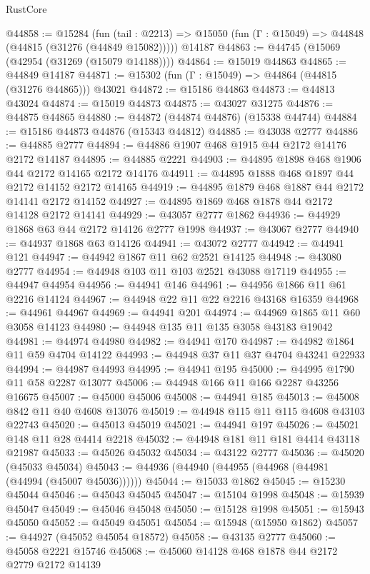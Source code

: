 \begin{lexlean}{RustCore}
\begin{coremodule}
@44858 := @15284
    (fun (tail : @2213) => @15050 (fun (Γ : @15049) => @44848 (@44815 (@31276 (@44849 @15082)))))
    @14187
@44863 := @44745 (@15069 (@42954 (@31269 (@15079 @14188))))
@44864 := @15019 @44863
@44865 := @44849 @14187
@44871 := @15302 (fun (Γ : @15049) => @44864 (@44815 (@31276 @44865))) @43021
@44872 := @15186 @44863
@44873 := @44813 @43024
@44874 := @15019 @44873
@44875 := @43027 @31275
@44876 := @44875 @44865
@44880 := @44872 (@44874 @44876) (@15338 @44744)
@44884 := @15186 @44873 @44876 (@15343 @44812)
@44885 := @43038 @2777
@44886 := @44885 @2777
@44894 := @44886 @1907 @468 @1915 @44 @2172 @14176 @2172 @14187
@44895 := @44885 @2221
@44903 := @44895 @1898 @468 @1906 @44 @2172 @14165 @2172 @14176
@44911 := @44895 @1888 @468 @1897 @44 @2172 @14152 @2172 @14165
@44919 := @44895 @1879 @468 @1887 @44 @2172 @14141 @2172 @14152
@44927 := @44895 @1869 @468 @1878 @44 @2172 @14128 @2172 @14141
@44929 := @43057 @2777 @1862
@44936 := @44929 @1868 @63 @44 @2172 @14126 @2777 @1998
@44937 := @43067 @2777
@44940 := @44937 @1868 @63 @14126
@44941 := @43072 @2777
@44942 := @44941 @121
@44947 := @44942 @1867 @11 @62 @2521 @14125
@44948 := @43080 @2777
@44954 := @44948 @103 @11 @103 @2521 @43088 @17119
@44955 := @44947 @44954
@44956 := @44941 @146
@44961 := @44956 @1866 @11 @61 @2216 @14124
@44967 := @44948 @22 @11 @22 @2216 @43168 @16359
@44968 := @44961 @44967
@44969 := @44941 @201
@44974 := @44969 @1865 @11 @60 @3058 @14123
@44980 := @44948 @135 @11 @135 @3058 @43183 @19042
@44981 := @44974 @44980
@44982 := @44941 @170
@44987 := @44982 @1864 @11 @59 @4704 @14122
@44993 := @44948 @37 @11 @37 @4704 @43241 @22933
@44994 := @44987 @44993
@44995 := @44941 @195
@45000 := @44995 @1790 @11 @58 @2287 @13077
@45006 := @44948 @166 @11 @166 @2287 @43256 @16675
@45007 := @45000 @45006
@45008 := @44941 @185
@45013 := @45008 @842 @11 @40 @4608 @13076
@45019 := @44948 @115 @11 @115 @4608 @43103 @22743
@45020 := @45013 @45019
@45021 := @44941 @197
@45026 := @45021 @148 @11 @28 @4414 @2218
@45032 := @44948 @181 @11 @181 @4414 @43118 @21987
@45033 := @45026 @45032
@45034 := @43122 @2777
@45036 := @45020 (@45033 @45034)
@45043 := @44936 (@44940 (@44955 (@44968 (@44981 (@44994 (@45007 @45036))))))
@45044 := @15033 @1862
@45045 := @15230 @45044
@45046 := @45043 @45045
@45047 := @15104 @1998
@45048 := @15939 @45047
@45049 := @45046 @45048
@45050 := @15128 @1998
@45051 := @15943 @45050
@45052 := @45049 @45051
@45054 := @15948 (@15950 @1862)
@45057 := @44927 (@45052 @45054 @18572)
@45058 := @43135 @2777
@45060 := @45058 @2221 @15746
@45068 := @45060 @14128 @468 @1878 @44 @2172 @2779 @2172 @14139

\end{coremodule}
\end{lexlean}

